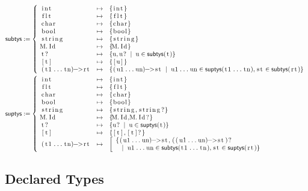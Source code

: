 \documentclass{article}
\newcommand{\code}[1]{\lstinline[columns=fixed]{#1}}
\newcommand{\mc}[1]{\textnormal{\code{#1}}}
\begin{document}
				\begin{align*}
					\mathsf{subtys} &:=
						\left\{
							\begin{array}{lll}
								\mc{int} & \mapsto & \{\mc{int}\}\\
								\mc{flt} & \mapsto & \{\mc{flt}\}\\
								\mc{char} & \mapsto & \{\mc{char}\}\\
								\mc{bool} & \mapsto & \{\mc{bool}\}\\
								\mc{string} & \mapsto & \{\mc{string}\}\\
								\mc{M.Id} & \mapsto & \{\mc{M.Id}\}\\
								\mc{t?} & \mapsto & \{\mc{u},\mc{u?} \;\mid\; \mc{u}\in\mathsf{subtys}(\mc{t})\}\\
								\mc{[t]} & \mapsto & \{\mc{[u]}\}\\
								\mc{(t1...tn)->rt} & \mapsto &
									\{\mc{(u1...un)->st} \;\mid\; \mc{u1...un}\in\mathsf{suptys}(\mc{t1...tn}),\mc{st}\in\mathsf{subtys}(\mc{rt})\}
							\end{array}
						\right.\\
					\mathsf{suptys} &:=
						\left\{
							\begin{array}{lll}
								\mc{int} & \mapsto & \{\mc{int}\}\\
								\mc{flt} & \mapsto & \{\mc{flt}\}\\
								\mc{char} & \mapsto & \{\mc{char}\}\\
								\mc{bool} & \mapsto & \{\mc{bool}\}\\
								\mc{string} & \mapsto & \{\mc{string},\mc{string?}\}\\
								\mc{M.Id} & \mapsto & \{\mc{M.Id},\mc{M.Id?}\}\\
								\mc{t?} & \mapsto & \{\mc{u?} \;\mid\; \mc{u}\in\mathsf{suptys}(\mc{t})\}\\
								\mc{[t]} & \mapsto & \{\mc{[t]}, \mc{[t]?}\}\\
								\mc{(t1...tn)->rt} & \mapsto &
									\left[
									\begin{array}{l}
										\{\mc{(u1...un)->st},\mc{((u1...un)->st)?} \\\ \ \;\mid\; \mc{u1...un}\in\mathsf{subtys}(\mc{t1...tn}),\mc{st}\in\mathsf{suptys}(\mc{rt})\}
									\end{array}
									\right.
							\end{array}
						\right.
				\end{align*}
				
		\subsection{Declared Types}
			
\end{document}

